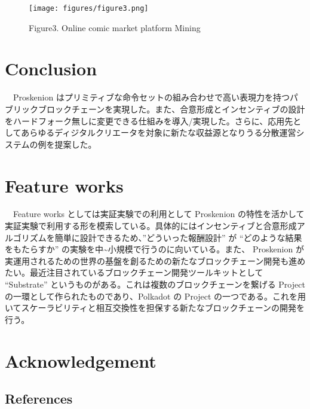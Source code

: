 \begin{figure}
\centering
\texttt{[image: figures/figure3.png]}
\caption{Figure3. Online comic market platform Mining}
\end{figure}

\hypertarget{conclusion}{%
\section{Conclusion}\label{conclusion}}

　Proskenion
はプリミティブな命令セットの組み合わせで高い表現力を持つパブリックブロックチェーンを実現した。また、合意形成とインセンティブの設計をハードフォーク無しに変更できる仕組みを導入/実現した。さらに、応用先としてあらゆるディジタルクリエータを対象に新たな収益源となりうる分散運営システムの例を提案した。

\hypertarget{feature-works}{%
\section{Feature works}\label{feature-works}}

　Feature works としては実証実験での利用として Proskenion
の特性を活かして実証実験で利用する形を模索している。具体的にはインセンティブと合意形成アルゴリズムを簡単に設計できるため、''どういった報酬設計''
が ``どのような結果をもたらすか''
の実験を中\textasciitilde 小規模で行うのに向いている。また、 Proskenion
が実運用されるための世界の基盤を創るための新たなブロックチェーン開発も進めたい。最近注目されているブロックチェーン開発ツールキットとして
``Substrate\cite{7}''
というものがある。これは複数のブロックチェーンを繋げる Project
の一環として作られたものであり、Polkadot\cite{8} の Project
の一つである。これを用いてスケーラビリティと相互交換性を担保する新たなブロックチェーンの開発を行う。

\hypertarget{acknowledgement}{%
\section{Acknowledgement}\label{acknowledgement}}

\hypertarget{references}{%
\subsection{References}\label{references}}

